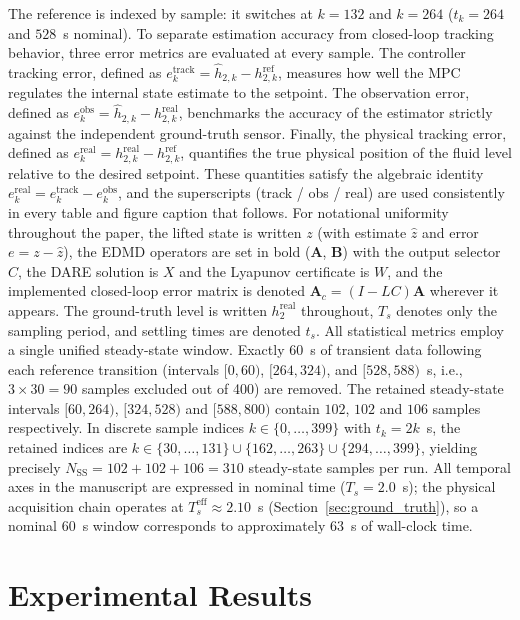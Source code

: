 \documentclass[asi,article,accept,pdftex,moreauthors]{Definitions/mdpi}
\newcommand{\rev}[1]{#1}%
\begin{document}
{The reference is indexed by sample: it switches at $k=132$ and $k=264$ ($t_k=264$ and $528$~s nominal). To separate estimation accuracy from closed-loop tracking behavior, three error metrics are evaluated at every sample. The controller tracking error, defined as $e^\mathrm{track}_k = \hat h_{2,k} - h^\mathrm{ref}_{2,k}$, measures how well the MPC regulates the internal state estimate to the setpoint. The observation error, defined as $e^\mathrm{obs}_k = \hat h_{2,k} - h^\mathrm{real}_{2,k}$, benchmarks the accuracy of the estimator strictly against the independent ground-truth sensor. Finally, the physical tracking error, defined as $e^\mathrm{real}_k = h^\mathrm{real}_{2,k} - h^\mathrm{ref}_{2,k}$, quantifies the true physical position of the fluid level relative to the desired setpoint. These quantities satisfy the algebraic identity $e^\mathrm{real}_k = e^\mathrm{track}_k - e^\mathrm{obs}_k$, and the superscripts (track / obs / real) are used consistently in every table and figure caption that follows. \rev{For notational uniformity throughout the paper, the lifted state is written $z$ (with estimate $\hat z$ and error $e=z-\hat z$), the EDMD operators are set in bold ($\mathbf A$, $\mathbf B$) with the output selector $C$, the DARE solution is $X$ and the Lyapunov certificate is $W$, and the implemented closed-loop error matrix is denoted $\mathbf A_c=(I-LC)\mathbf A$ wherever it appears. The ground-truth level is written $h_2^\mathrm{real}$ throughout, $T_s$ denotes only the sampling period, and settling times are denoted $t_s$.} All statistical metrics employ a single unified steady-state window. Exactly $60$~s of transient data following each reference transition (intervals $[0,60)$, $[264,324)$, and $[528,588)$~s, i.e.,\ $3\times 30 = 90$ samples excluded out of 400) are removed. The retained steady-state intervals $[60,264)$, $[324,528)$ and $[588,800)$ contain $102$, $102$ and $106$ samples respectively. In discrete sample indices $k\in\{0,\ldots,399\}$ with $t_k=2k$~s, the retained indices are $k\in\{30,\ldots,131\}\cup\{162,\ldots,263\}\cup\{294,\ldots,399\}$, yielding precisely $N_\mathrm{SS} = 102+102+106 = 310$ steady-state samples per run. All temporal axes in the manuscript are expressed in nominal time ($T_s=2.0$~s); the physical acquisition chain operates at $T_s^\mathrm{eff}\approx 2.10$~s (Section~\ref{sec:ground_truth}), so a nominal $60$~s window corresponds to approximately $63$~s of wall-clock time.}
\section{Experimental Results}
\label{sec:results}
\end{document}
